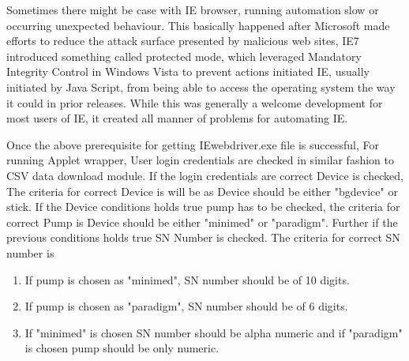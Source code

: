 \documentclass[article,type=msc,colorback,accentcolor=tud9c,twoside,11pt]{tudthesis}
\begin{document}
	Sometimes there might be case with IE browser, running automation slow or occurring unexpected behaviour. This basically happened after Microsoft made efforts to reduce the attack surface presented by malicious web sites, IE7 introduced something called protected mode, which leveraged Mandatory Integrity Control in Windows Vista to prevent actions initiated IE, usually initiated by Java Script, from being able to access the operating system the way it could in prior releases. While this was generally a welcome development for most users of IE, it created all manner of problems for automating IE.
	
	Once the above prerequisite for getting IEwebdriver.exe file is successful, For running Applet wrapper, User login credentials are checked in similar fashion to CSV data download module. If the login credentials are correct Device is checked, The criteria for correct Device is will be as Device should be either "bgdevice" or stick. If the Device conditions holds true pump has to be checked, the criteria for correct Pump is Device should be either "minimed" or "paradigm".  Further if the previous conditions holds true SN Number is checked. The criteria for correct SN number is
	\begin{enumerate}
		\item If pump is chosen as "minimed", SN number should  be of 10 digits.
		\item  If pump is chosen as "paradigm", SN number should  be of 6 digits.
		\item  If "minimed" is chosen SN number should be alpha numeric and if "paradigm" is chosen pump should be only numeric.
	\end{enumerate}
	
\end{document}
